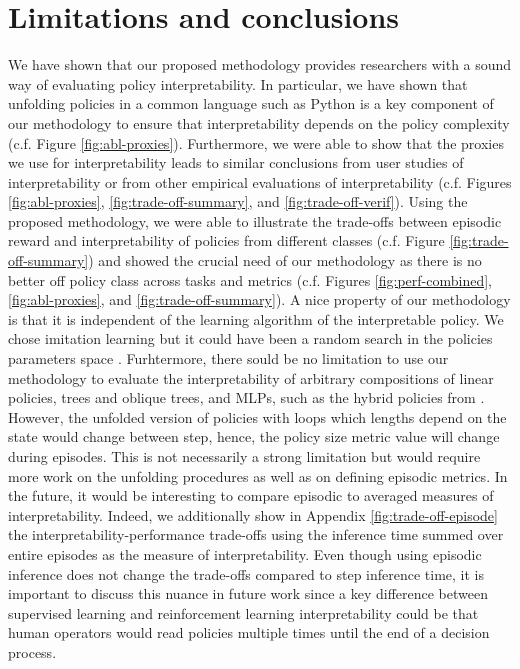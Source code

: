 \section{Limitations and conclusions}\label{sec:ccl}
We have shown that our proposed methodology provides researchers with a sound way of evaluating policy interpretability.
In particular, we have shown that unfolding policies in a common language such as Python is a key component of our methodology to ensure that interpretability depends on the policy complexity (c.f. Figure \ref{fig:abl-proxies}).
Furthermore, we were able to show that the proxies we use for interpretability leads to similar conclusions from user studies of interpretability or from other empirical evaluations of interpretability (c.f. Figures \ref{fig:abl-proxies}, \ref{fig:trade-off-summary}, and \ref{fig:trade-off-verif}).
Using the proposed methodology, we were able to illustrate the trade-offs between episodic reward and interpretability of policies from different classes (c.f. Figure \ref{fig:trade-off-summary}) and showed the crucial need of our methodology as there is no better off policy class across tasks and metrics (c.f. Figures \ref{fig:perf-combined}, \ref{fig:abl-proxies}, and \ref{fig:trade-off-summary}). 
A nice property of our methodology is that it is independent of the learning algorithm of the interpretable policy.
We chose imitation learning but it could have been a random search in the policies parameters space \cite{empirical-evidence}.
Furhtermore, there sould be no limitation to use our methodology to evaluate the interpretability of arbitrary compositions of linear policies, trees and oblique trees, and MLPs, such as the hybrid policies from \cite{shindo2024blendrl}.
However, the unfolded version of policies with loops which lengths depend on the state would change between step, hence, the policy size metric value will change during episodes.
This is not necessarily a strong limitation but would require more work on the unfolding procedures as well as on defining episodic metrics. 
In the future, it would be interesting to compare episodic to averaged measures of interpretability. Indeed, we additionally show in Appendix \ref{fig:trade-off-episode} the interpretability-performance trade-offs using the inference time summed over entire episodes as the measure of interpretability.
Even though using episodic inference does not change the trade-offs compared to step inference time, it is important to discuss this nuance in future work since a key difference between supervised learning and reinforcement learning interpretability could be that human operators would read policies multiple times until the end of a decision process.
